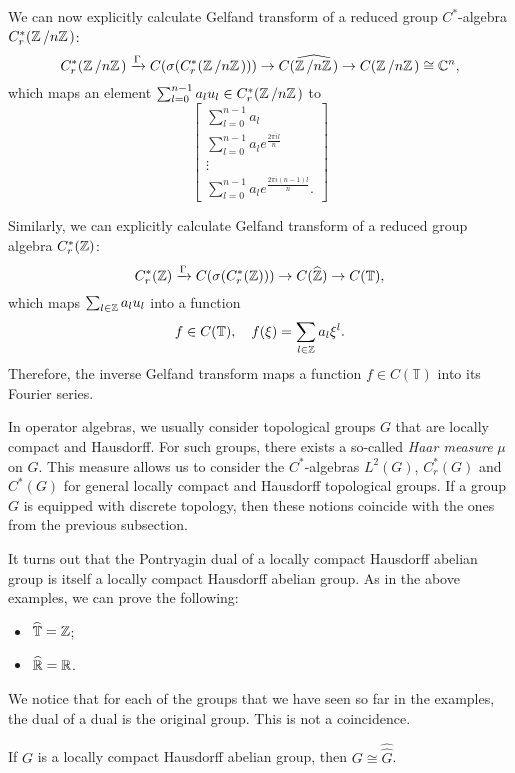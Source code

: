 \begin{example}\label{ex:3.2}
  We can now explicitly calculate Gelfand transform of a reduced group $C^*$-algebra $C_r ^* (\quot{\Z}{n\Z})$:
  $$C_r ^* (\quot{\Z}{n\Z}) \xrightarrow{\Gamma} C (\sigma (C_r ^* (\quot{\Z}{n\Z}))) \to C(\widehat{\quot{\Z}{n\Z}}) \to C(\quot{\Z}{n\Z}) \cong \C^n,$$
  which maps an element $\sum_{l = 0} ^{n - 1} a_l u_l \in C_r ^* (\quot{\Z}{n\Z})$ to
  $$\begin{bmatrix}
    \sum_{l = 0} ^{n - 1} a_l\\ \sum_{l = 0} ^{n - 1} a_l e^{\frac{2 \pi i l}{n}}\\ \vdots \\ \sum_{l = 0} ^{n - 1} a_l e^{\frac{2 \pi i (n - 1) l}{n}}.
  \end{bmatrix}$$
\end{example}

\begin{example}\label{ex:3.3}
  Similarly, we can explicitly calculate Gelfand transform of a reduced group algebra $C_r ^* (\mathbb {Z})$:
  $$C_r ^* (\mathbb {Z}) \xrightarrow{\Gamma} C(\sigma(C^* _r (\mathbb {Z}))) \to C(\widehat{\mathbb {Z}}) \to C(\mathbb{T}),$$
  which maps $\sum_{l \in \mathbb {Z}} a_l u_l$ into a function $$f \in C(\mathbb{T}),\quad f(\xi) = \sum_{l \in \mathbb {Z}} a_l \xi^l.$$
  Therefore, the inverse Gelfand transform maps a function $f \in C(\mathbb{T})$ into its Fourier series.
\end{example}

  In operator algebras, we usually consider topological groups $G$ that are locally compact and Hausdorff.
  For such groups, there exists a so-called \emph{Haar measure} $\mu$ on $G$. This measure allows us to 
  consider the $C^*$-algebras $L^2 (G)$, $C_r ^* (G)$ and $C^* (G)$ for general locally compact and Hausdorff topological groups.
  If a group $G$ is equipped with discrete topology, then these notions coincide with the ones from the previous subsection.  

\begin{example}
  It turns out that the Pontryagin dual of a locally compact Hausdorff abelian group is itself a locally compact Hausdorff abelian group.
  As in the above examples, we can prove the following:
  \begin{itemize}
    \item $\widehat{\mathbb{T}} = {\mathbb {Z}}$;
    \item $\widehat{\mathbb {R}} = \mathbb {R}$.
  \end{itemize}
\end{example}

 We notice that for each of the groups that we have seen so far in the examples, the dual of a dual is the original group.
This is not a coincidence.

\begin{theorem}[Pontryagin]
  If $G$ is a locally compact Hausdorff abelian group,
  then $G \cong \widehat{\widehat{G}}$.
\end{theorem}